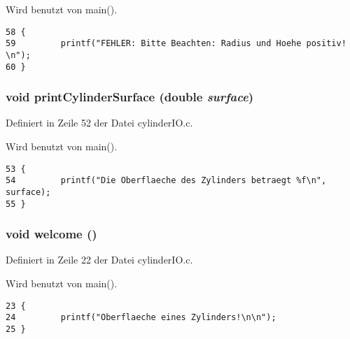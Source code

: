 Wird benutzt von main().

\footnotesize\begin{verbatim}58 {
59         printf("FEHLER: Bitte Beachten: Radius und Hoehe positiv! \n");
60 }
\end{verbatim}\normalsize 


\subsubsection{\setlength{\rightskip}{0pt plus 5cm}void print\-Cylinder\-Surface (double {\em surface})}\label{cylinder_i_o_8c_d946199312576e1ff9d3ac37a8bedacf}




Definiert in Zeile 52 der Datei cylinder\-IO.c.

Wird benutzt von main().

\footnotesize\begin{verbatim}53 {
54         printf("Die Oberflaeche des Zylinders betraegt %f\n", surface);
55 }
\end{verbatim}\normalsize 


\subsubsection{\setlength{\rightskip}{0pt plus 5cm}void welcome ()}\label{cylinder_i_o_8c_fdf71b0239b7d4a9b67b784177146385}




Definiert in Zeile 22 der Datei cylinder\-IO.c.

Wird benutzt von main().

\footnotesize\begin{verbatim}23 {
24         printf("Oberflaeche eines Zylinders!\n\n");
25 }
\end{verbatim}\normalsize 



